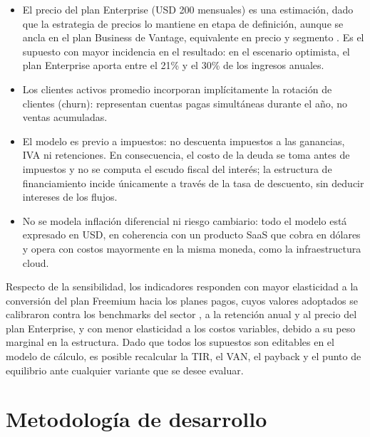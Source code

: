 \begin{itemize}
\item El precio del plan Enterprise (USD 200 mensuales) es una estimación, dado que la estrategia de precios lo mantiene en etapa de definición, aunque se ancla en el plan Business de Vantage, equivalente en precio y segmento \parencite{Vantage2026}. Es el supuesto con mayor incidencia en el resultado: en el escenario optimista, el plan Enterprise aporta entre el 21\% y el 30\% de los ingresos anuales.
\item Los clientes activos promedio incorporan implícitamente la rotación de clientes (churn): representan cuentas pagas simultáneas durante el año, no ventas acumuladas.
\item El modelo es previo a impuestos: no descuenta impuestos a las ganancias, IVA ni retenciones. En consecuencia, el costo de la deuda se toma antes de impuestos y no se computa el escudo fiscal del interés; la estructura de financiamiento incide únicamente a través de la tasa de descuento, sin deducir intereses de los flujos.
\item No se modela inflación diferencial ni riesgo cambiario: todo el modelo está expresado en USD, en coherencia con un producto SaaS que cobra en dólares y opera con costos mayormente en la misma moneda, como la infraestructura cloud.
\end{itemize}

Respecto de la sensibilidad, los indicadores responden con mayor elasticidad a la conversión del plan Freemium hacia los planes pagos, cuyos valores adoptados se calibraron contra los benchmarks del sector \parencite{FirstPageSageBenchmarks2026, FirstPageSageFreemium2026}, a la retención anual y al precio del plan Enterprise, y con menor elasticidad a los costos variables, debido a su peso marginal en la estructura. Dado que todos los supuestos son editables en el modelo de cálculo, es posible recalcular la TIR, el VAN, el payback y el punto de equilibrio ante cualquier variante que se desee evaluar.

\section{Metodología de desarrollo}

